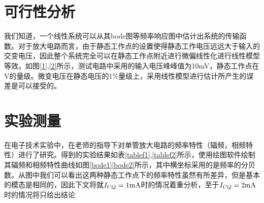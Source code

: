\documentclass[UTF8,a4paper]{ctexart}
\begin{document}
\section{可行性分析}
我们知道，一个线性系统可以从其bode图等频率响应图中估计出系统的传输函数。对于放大电路而言，由于静态工作点的设置使得静态工作电压远远大于输入的交变电压，因此整个系统完全可以在静态工作点附近进行微偏线性化进行线性模型等效。如图\ref{1},\ref{2}所示，测试电路中采用的输入电压峰峰值为10mV，静态工作点在V的量级。微变电压在静态电压的1\%量级上，采用线性模型进行估计所产生的误差是可以接受的。

\section{实验测量}
在电子技术实验中，在老师的指导下对单管放大电路的频率特性（辐频，相频特性）进行了研究。得到的实验结果如表\ref{tablef1},\ref{tablef2}所示，使用绘图软件绘制其辐频和相频特性曲线如图\ref{bode1}\ref{bode2}所示，其中横坐标采用的是频率的分贝数。从图中我们可以看出这两种静态工作点下的频率特性虽然有所差异，但是基本的模态是相同的，因此下文将就$I_{CQ}=1\rm{mA}$时的情况着重分析，至于$I_{CQ}=2\rm{mA}$时的情况将只给出结论
\end{document}
